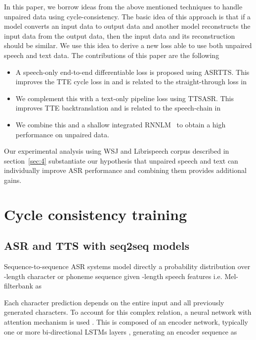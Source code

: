 \documentclass[a4paper]{article}
\begin{document}
In this paper, we borrow ideas from the above mentioned techniques to handle unpaired data using cycle-consistency. The basic idea of this approach is that if a model converts an input data to output data and another model reconstructs the input data from the output data, then the input data and its reconstruction should be similar. We use this idea to derive a new loss able to use both unpaired speech and text data. The contributions of this paper are the following
\begin{itemize}
    \item A speech-only end-to-end differentiable loss is proposed using ASRTTS. This improves the TTE cycle loss in \cite{hori2018cycle} and is related to the straight-through loss in~\cite{tjandra2018end}
    \item We complement this with a text-only pipeline loss using TTSASR. This improves TTE backtranslation \cite{hayashi2018back} and is related to the speech-chain in \cite{tjandra2017listening}
    \item We combine this and a shallow integrated RNNLM~\cite{hori2017advances,kannan2018analysis} to obtain a high performance on unpaired data.
\end{itemize}
Our experimental analysis using WSJ and Librispeech corpus described in section~\ref{sec:4} substantiate our hypothesis that unpaired speech and text can individually improve ASR performance and combining them provides additional gains.

\section{Cycle consistency training}\label{sec:2}

\subsection{ASR and TTS with seq2seq models}
Sequence-to-sequence ASR systems \cite{bahdanau2016end} model directly a probability distribution over -length character or phoneme sequence  given -length speech features  i.e. Mel-filterbank as 



Each character prediction depends on the entire input and all previously generated characters. To account for this complex relation, a neural network with attention mechanism is used \cite{bahdanau2014neural}. This is composed of an encoder network, typically one or more bi-directional LSTMs layers \cite{hochreiter1997long}, generating an encoder sequence  as
\end{document}
